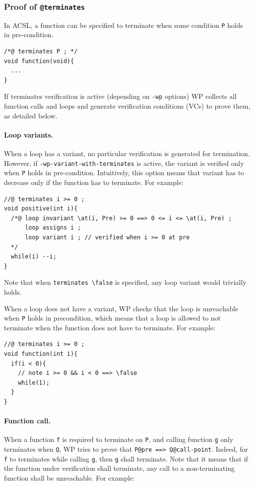 \subsubsection{Proof of \texttt{@terminates}}
\label{ss-sec:plugin-terminates}

In ACSL, a function can be specified to terminate when some condition \verb+P+ holds
in pre-condition.

\begin{lstlisting}[style=c]
/*@ terminates P ; */
void function(void){
  ...
}
\end{lstlisting}

If terminates verification is active (depending on \verb+-wp+ options) WP collects all function calls and loops
and generate verification conditions (VCs) to prove them, as detailed below.

\paragraph{Loop variants.} When a loop has a variant, no particular verification
is generated for termination. However, if \verb+-wp-variant-with-terminates+ is
active, the variant is verified only when \verb+P+ holds in pre-condition.
Intuitively, this option means that variant has to decrease only if the function has to terminate. For example:

\begin{lstlisting}[style=c]
//@ terminates i >= 0 ;
void positive(int i){
  /*@ loop invariant \at(i, Pre) >= 0 ==> 0 <= i <= \at(i, Pre) ;
      loop assigns i ;
      loop variant i ; // verified when i >= 0 at pre
  */
  while(i) --i;
}
\end{lstlisting}

Note that when \verb+terminates \false+ is specified, any loop
variant would trivially holds.

When a loop does not have a variant, WP checks that the loop is unreachable
when \verb+P+ holds in precondition, which means that a loop is allowed to not
terminate when the function does not have to terminate. For example:

\begin{lstlisting}[style=c]
//@ terminates i >= 0 ;
void function(int i){
  if(i < 0){
    // note i >= 0 && i < 0 ==> \false
    while(1);
  }
}
\end{lstlisting}

\paragraph{Function call.} When a function \verb+f+ is required to terminate on
\verb+P+, and calling function \verb+g+ only terminates when \verb+Q+, WP tries to
prove that \verb+P@pre ==> Q@call-point+. Indeed, for \verb+f+ to terminates while calling
\verb+g+, then \verb+g+ shall terminate. Note that it
means that if the function under verification shall terminate, any call to a
non-terminating function shall be unreachable. For example:

